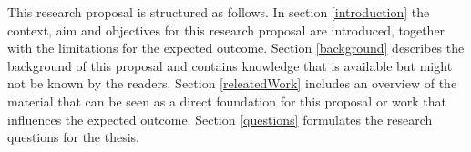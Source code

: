 
This research proposal is structured as follows. In section \ref{introduction} the context, aim and objectives for this research proposal are introduced, together with the limitations for the expected outcome. Section \ref{background} describes the background of this proposal and contains knowledge that is available but might not be known by the readers. Section \ref{releatedWork} includes an overview of the material that can be seen as a direct foundation for this proposal or work that influences the expected outcome. Section \ref{questions} formulates the research questions for the thesis.